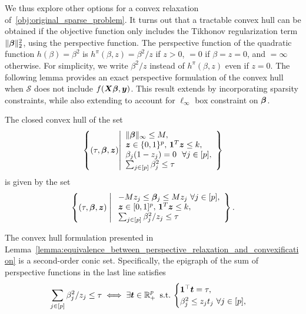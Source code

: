 We thus explore other options for a convex relaxation of~\eqref{obj:original_sparse_problem}.
It turns out that a tractable convex hull can be obtained if the objective function only includes the Tikhonov regularization term $\| \bm{\beta} \|_2^2$, using the perspective function.
The perspective function of the quadratic function $h(\beta) = \beta^2$ is $h^\pi(\beta, z) = \beta^2 / z$ if $z > 0$, $= 0$ if $\beta = z = 0$, and $= \infty$ otherwise.
For simplicity, we write $\beta^2/z$ instead of $h^\pi(\beta, z)$ even if $z = 0$. 
The following lemma provides an exact perspective formulation of the convex hull when $\mathcal S$ does not include $f(\bm{X} \bm{\beta}, \bm{y})$. This result extends \citep[Lemma~6]{gunluk2010perspective} by incorporating sparsity constraints, while also extending \citep[Theorem~2]{shafiee2024constrained} to account for $\ell_\infty$ box constraint on $\bm{\beta}$.
\begin{lemma}
    \label{lemma:equivalence_between_perspective_relaxation_and_convexification}
    The closed convex hull of the set
    \begin{align*}
        \left\{ (\tau, \bm{\beta}, \bm{z}) \middle|
        \begin{array}{l}
            \| \bm{\beta} \|_\infty \leq M, \,  \\
            \bm{z} \in \{0, 1\}^p, \, \mathbf{1}^T \bm{z} \leq k, \\ \beta_j ( 1 - z_j) = 0 ~~ \forall j \in [p], \\
            \sum_{j \in [p]} \beta_j^2 \leq \tau
        \end{array}
        \right\}
    \end{align*}
    is given by the set
    \begin{align*}
        \left\{ (\tau, \bm{\beta}, \bm{z})  \;\middle|\;
        \begin{array}{l} 
            -M z_j\leq \bm{\beta}_j \leq M z_j ~ \forall j \in [p], \\
            \bm{z} \in [0, 1]^p, \, \mathbf{1}^T \bm{z} \leq k, \\
            \sum_{j \in [p]} \beta_j^2 / z_j \leq \tau
        \end{array}
        \right\}.
    \end{align*}
\end{lemma}
The convex hull formulation presented in Lemma~\ref{lemma:equivalence_between_perspective_relaxation_and_convexification} is a second-order conic set.
Specifically, the epigraph of the sum of perspective functions in the last line satisfies
\begin{align*}
    \sum_{j \in [p]} {\beta_j^2}/{z_j} \leq \tau \iff \exists \bm{t} \in \mathbb{R}_+^p ~ \operatorname{s.\!t.\!} ~ 
    \begin{cases}
        \bm 1^\top \bm t = \tau, \\
        \beta_j^2 \leq z_j t_j ~ \forall j \in [p],
    \end{cases}
\end{align*}
